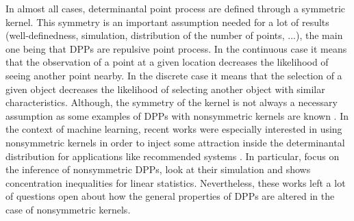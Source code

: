 \documentclass{article}
\numberwithin{equation}{section}
\theoremstyle{plain}
\begin{document}
In almost all cases, determinantal point process are defined through a symmetric kernel. This symmetry is an important assumption needed for a lot of results (well-definedness, simulation, distribution of the number of points, ...), the main one being that DPPs are repulsive point process. In the continuous case it means that the observation of a point at a given location decreases the likelihood of seeing another point nearby. In the discrete case it means that the selection of a given object decreases the likelihood of selecting another object with similar characteristics. Although, the symmetry of the kernel is not always a necessary assumption as some examples of DPPs with nonsymmetric kernels are known \cite{Borodin09, Brunel18, Lyons, Soshnikov}. In the context of machine learning, recent works were especially interested in using nonsymmetric kernels in order to inject some attraction inside the determinantal distribution \cite{Bardenet, Brunel18, Gartrell, Gartrell21, Han, Han22} for applications like recommended systems \cite{Gartrell, Gartrell21}. In particular, \cite{Brunel18, Gartrell, Gartrell21} focus on the inference of nonsymmetric DPPs, \cite{Han, Han22} look at their simulation and \cite{Bardenet} shows concentration inequalities for linear statistics. Nevertheless, these works left a lot of questions open about how the general properties of DPPs are altered in the case of nonsymmetric kernels.

\medskip
\end{document}
